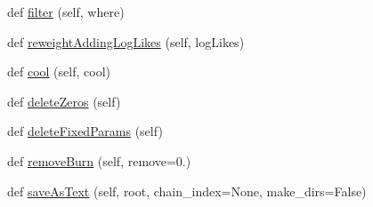 \begin{DoxyCompactItemize}
\item 
def \mbox{\hyperlink{classgetdist_1_1chains_1_1WeightedSamples_a2b75dc00ef960c6d4769476c6125d50f}{filter}} (self, where)
\item 
def \mbox{\hyperlink{classgetdist_1_1chains_1_1WeightedSamples_a92b26d5dd4a59044bcf0977deb5a77df}{reweight\+Adding\+Log\+Likes}} (self, log\+Likes)
\item 
def \mbox{\hyperlink{classgetdist_1_1chains_1_1WeightedSamples_ac1117664a18dbf44a352512c36c6a675}{cool}} (self, cool)
\item 
def \mbox{\hyperlink{classgetdist_1_1chains_1_1WeightedSamples_af496bff9dd6b71eaf5618760aa442f50}{delete\+Zeros}} (self)
\item 
def \mbox{\hyperlink{classgetdist_1_1chains_1_1WeightedSamples_a5369d0f11ce50fafc68a3979134d3593}{delete\+Fixed\+Params}} (self)
\item 
def \mbox{\hyperlink{classgetdist_1_1chains_1_1WeightedSamples_abebbaf7a369f8cbe63df082ba39969bb}{remove\+Burn}} (self, remove=0.)
\item 
def \mbox{\hyperlink{classgetdist_1_1chains_1_1WeightedSamples_a934090c8c7d816f926533458ad57973d}{save\+As\+Text}} (self, root, chain\+\_\+index=None, make\+\_\+dirs=False)
\end{DoxyCompactItemize}
